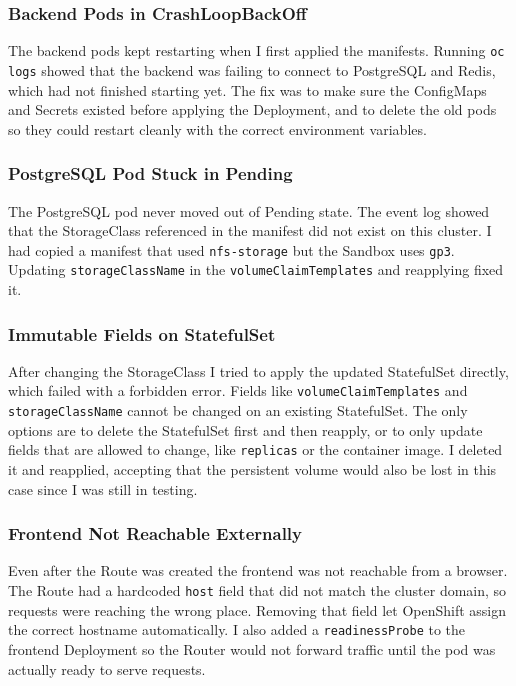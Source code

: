 \subsubsection{Backend Pods in CrashLoopBackOff}

The backend pods kept restarting when I first applied the manifests. Running
\texttt{oc logs} showed that the backend was failing to connect to PostgreSQL and Redis,
which had not finished starting yet. The fix was to make sure the ConfigMaps and Secrets
existed before applying the Deployment, and to delete the old pods so they could restart
cleanly with the correct environment variables.

\subsubsection{PostgreSQL Pod Stuck in Pending}

The PostgreSQL pod never moved out of Pending state. The event log showed that the
StorageClass referenced in the manifest did not exist on this cluster. I had copied a
manifest that used \texttt{nfs-storage} but the Sandbox uses \texttt{gp3}. Updating
\texttt{storageClassName} in the \texttt{volumeClaimTemplates} and reapplying fixed it.

\subsubsection{Immutable Fields on StatefulSet}

After changing the StorageClass I tried to apply the updated StatefulSet directly, which
failed with a forbidden error. Fields like \texttt{volumeClaimTemplates} and
\texttt{storageClassName} cannot be changed on an existing StatefulSet. The only options
are to delete the StatefulSet first and then reapply, or to only update fields that are
allowed to change, like \texttt{replicas} or the container image. I deleted it and
reapplied, accepting that the persistent volume would also be lost in this case since I
was still in testing.

\subsubsection{Frontend Not Reachable Externally}

Even after the Route was created the frontend was not reachable from a browser. The
Route had a hardcoded \texttt{host} field that did not match the cluster domain, so
requests were reaching the wrong place. Removing that field let OpenShift assign the
correct hostname automatically. I also added a \texttt{readinessProbe} to the frontend
Deployment so the Router would not forward traffic until the pod was actually ready to
serve requests.
